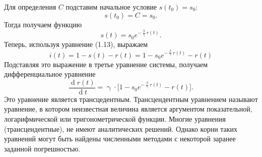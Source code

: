 \documentclass[a4paper, 14pt]{extreport}
\numberwithin{equation}{section}
\renewcommand{\beta}{\upbeta}
\renewcommand{\gamma}{\upgamma}
\renewcommand{\d}{\operatorname{d}}
\begin{document}
	Для определения $C$ подставим начальное условие $s(t_0) = s_0$:
	$$s(t_0) = C = s_0.$$
	Тогда получаем функцию 
	\begin{equation}
		s(t) = s_0 e^{-\frac \beta \gamma r(t)}.
	\end{equation}
	Теперь, используя уравнение (1.13), выражаем 
	\begin{equation}
		i(t) = 1 - s(t) - r(t) = 1 - s_0 e^{-\frac \beta \gamma r(t)} - r(t)
	\end{equation}
	Подставляя это выражение в третье уравнение системы, получаем дифференциальное уравнение 
	\begin{equation}
		\dfrac{\d r(t)}{\d t} = \gamma\cdot \big[1 - s_0 e^{-\frac \beta \gamma r(t)} - r(t)\big].
	\end{equation}
	Это уравнение является трансцедентным. Трансцендентным уравнением называют уравнение, в котором неизвестная величина является аргументом показательной, логарифмической или тригонометрической функции. Многие уравнения (трансцендентные), не имеют аналитических решений. Однако корни таких уравнений могут быть найдены численными методами с некоторой заранее заданной погрешностью.
	
\end{document}
